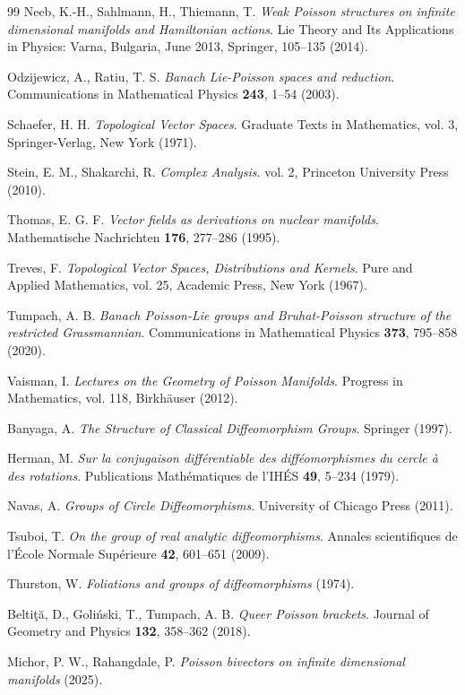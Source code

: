 \documentclass[11pt,reqno]{amsart}
\theoremstyle{definition}
\numberwithin{equation}{section}
\begin{document}
\begin{thebibliography}{99}
 Neeb, K.-H., Sahlmann, H., Thiemann, T. \textit{Weak Poisson structures on infinite dimensional manifolds and Hamiltonian actions}. Lie Theory and Its Applications in Physics: Varna, Bulgaria, June 2013, Springer, 105--135 (2014).

 Odzijewicz, A., Ratiu, T. S. \textit{Banach Lie-Poisson spaces and reduction}. Communications in Mathematical Physics \textbf{243}, 1--54 (2003).

 Schaefer, H. H. \textit{Topological Vector Spaces}. Graduate Texts in Mathematics, vol. 3, Springer-Verlag, New York (1971).

 Stein, E. M., Shakarchi, R. \textit{Complex Analysis}. vol. 2, Princeton University Press (2010).

 Thomas, E. G. F. \textit{Vector fields as derivations on nuclear manifolds}. Mathematische Nachrichten \textbf{176}, 277--286 (1995).

 Treves, F. \textit{Topological Vector Spaces, Distributions and Kernels}. Pure and Applied Mathematics, vol. 25, Academic Press, New York (1967).

 Tumpach, A. B. \textit{Banach Poisson-Lie groups and Bruhat-Poisson structure of the restricted Grassmannian}. Communications in Mathematical Physics \textbf{373}, 795--858 (2020).

 Vaisman, I. \textit{Lectures on the Geometry of Poisson Manifolds}. Progress in Mathematics, vol. 118, Birkhäuser (2012).

 Banyaga, A. \textit{The Structure of Classical Diffeomorphism Groups}. Springer (1997).

 Herman, M. \textit{Sur la conjugaison différentiable des difféomorphismes du cercle à des rotations}. Publications Mathématiques de l'IHÉS \textbf{49}, 5--234 (1979).

 Navas, A. \textit{Groups of Circle Diffeomorphisms}. University of Chicago Press (2011).

 Tsuboi, T. \textit{On the group of real analytic diffeomorphisms}. Annales scientifiques de l'École Normale Supérieure \textbf{42}, 601--651 (2009).

 Thurston, W. \textit{Foliations and groups of diffeomorphisms} (1974).

 Beltiţă, D., Goliński, T., Tumpach, A. B. \textit{Queer Poisson brackets}. Journal of Geometry and Physics \textbf{132}, 358--362 (2018).

 Michor, P. W., Rahangdale, P. \textit{Poisson bivectors on infinite dimensional manifolds} (2025).

\end{thebibliography}
\end{document}
